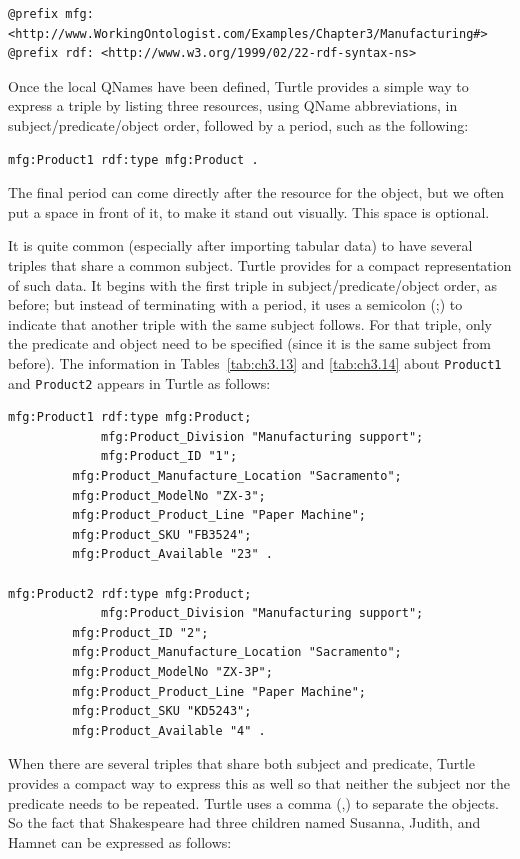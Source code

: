 \begin{lstlisting}
@prefix mfg: <http://www.WorkingOntologist.com/Examples/Chapter3/Manufacturing#>
@prefix rdf: <http://www.w3.org/1999/02/22-rdf-syntax-ns> 
\end{lstlisting}

Once the local QNames have been defined, Turtle provides a  simple
way to express a triple by listing three resources, using QName
abbreviations, in subject/predicate/object order, followed by a period,
such as the following:

\begin{lstlisting}
mfg:Product1 rdf:type mfg:Product .
\end{lstlisting}

The final period can come directly after the resource for the object,
but we often put a space in front of it, to make it stand out visually.
This space is optional.

It is quite common (especially after importing tabular data) to have
several triples that share a common subject. Turtle provides for a
compact representation of such data. It begins with the first triple in
subject/predicate/object order, as before; but instead of terminating
with a period, it uses a semicolon (;) to indicate that another triple
with the same subject follows. For that triple, only the predicate and
object need to be specified (since it is the same subject from before).
The information in Tables~\ref{tab:ch3.13} and \ref{tab:ch3.14} about \texttt{Product1} and \texttt{Product2}
appears in Turtle as follows:

\begin{lstlisting}
mfg:Product1 rdf:type mfg:Product;
             mfg:Product_Division "Manufacturing support"; 
             mfg:Product_ID "1";
	     mfg:Product_Manufacture_Location "Sacramento";
	     mfg:Product_ModelNo "ZX-3"; 
	     mfg:Product_Product_Line "Paper Machine"; 
	     mfg:Product_SKU "FB3524";
	     mfg:Product_Available "23" .

mfg:Product2 rdf:type mfg:Product; 
             mfg:Product_Division "Manufacturing support"; 
	     mfg:Product_ID "2"; 
	     mfg:Product_Manufacture_Location "Sacramento"; 
	     mfg:Product_ModelNo "ZX-3P"; 
 	     mfg:Product_Product_Line "Paper Machine"; 
	     mfg:Product_SKU "KD5243";
	     mfg:Product_Available "4" .
\end{lstlisting}

When there are several triples that share both subject and predicate,
Turtle provides a compact way to express this as well so that neither
the subject nor the predicate needs to be repeated. Turtle uses a comma
(,) to separate the objects. So the fact that Shakespeare had three
children named Susanna, Judith, and Hamnet can be expressed as follows:

